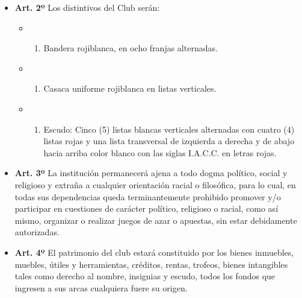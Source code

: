 \documentclass[]{book}
\providecommand{\tightlist}{%
  \setlength{\itemsep}{0pt}\setlength{\parskip}{0pt}}
\begin{document}
\begin{itemize}
\tightlist
\item
  \textbf{Art. 2º}
  Los distintivos del Club serán:

  \begin{itemize}
  \item
    \begin{enumerate}
    \def\labelenumi{\alph{enumi})}
    \tightlist
    \item
      Bandera rojiblanca, en ocho franjas alternadas.
    \end{enumerate}
  \item
    \begin{enumerate}
    \def\labelenumi{\alph{enumi})}
    \setcounter{enumi}{1}
    \tightlist
    \item
      Casaca uniforme rojiblanca en listas verticales.
    \end{enumerate}
  \item
    \begin{enumerate}
    \def\labelenumi{\alph{enumi})}
    \setcounter{enumi}{2}
    \tightlist
    \item
      Escudo: Cinco (5) listas blancas verticales alternadas con cuatro (4) listas rojas y una lista transversal de izquierda a derecha y de abajo hacia arriba color blanco con las siglas I.A.C.C. en letras rojas.
    \end{enumerate}
  \end{itemize}
\end{itemize}

\begin{itemize}
\tightlist
\item
  \textbf{Art. 3º}
  La institución permanecerá ajena a todo dogma político, social y religioso y extraña a cualquier orientación racial o filosófica, para lo cual, en todas sus dependencias queda terminantemente prohibido promover y/o participar en cuestiones de carácter político, religioso o racial, como así mismo, organizar o realizar juegos de azar o apuestas, sin estar debidamente autorizadas.
\end{itemize}

\begin{itemize}
\tightlist
\item
  \textbf{Art. 4º}
  El patrimonio del club estará constituido por los bienes inmuebles, muebles, útiles y herramientas, créditos, rentas, trofeos, bienes intangibles tales como derecho al nombre, insignias y escudo, todos los fondos que ingresen a sus arcas cualquiera fuere su origen.
\end{itemize}
\end{document}
